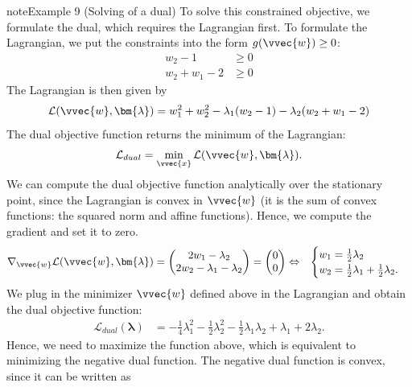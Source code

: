 \documentclass[letterpaper,10pt,english]{jupyterBook}
\begin{document}
\begin{sphinxadmonition}{note}{Example 9 (Solving of a dual)}
\sphinxAtStartPar
To solve this constrained objective, we formulate the dual, which requires the Lagrangian first. To formulate the Lagrangian, we put the constraints into the form \(g(\vvec{w})\geq 0\):
\begin{align*}
w_2-1&\geq 0\\
w_2+w_1-2 &\geq 0
\end{align*}
\sphinxAtStartPar
The Lagrangian is then given by
\begin{equation*}
\begin{split}\mathcal{L}(\vvec{w},\bm{\lambda})=w_1^2 +w_2^2 -\lambda_1(w_2-1)-\lambda_2(w_2+w_1-2)\end{split}
\end{equation*}
The dual objective function returns the minimum of the Lagrangian:
\begin{equation*}
\begin{split}\mathcal{L}_{dual}=\min_{\vvec{x}}\mathcal{L}(\vvec{w},\bm{\lambda}).\end{split}
\end{equation*}
We can compute the dual objective function analytically over the stationary point, since the Lagrangian is convex in \(\vvec{w}\) (it is the sum of convex functions: the squared norm and affine functions). Hence, we compute the gradient and set it to zero.
\begin{align*}
\nabla_\vvec{w}\mathcal{L}(\vvec{w},\bm{\lambda}) &= \begin{pmatrix}
2w_1-\lambda_2\\
2w_2-\lambda_1-\lambda_2
\end{pmatrix}
=\begin{pmatrix}
0\\ 0
\end{pmatrix}
\Leftrightarrow & \begin{cases}
w_1 = \frac12 \lambda_2\\
w_2 = \frac12 \lambda_1 + \frac12 \lambda_2.
\end{cases}
\end{align*}
\sphinxAtStartPar
We plug in the minimizer \(\vvec{w}\) defined above in the Lagrangian and obtain the dual objective function:
\begin{align*}
\mathcal{L}_{dual}(\bm{\lambda}) &= -\frac14 \lambda_1^2-\frac12 \lambda_2^2 -\frac12\lambda_1\lambda_2 + \lambda_1 +2\lambda_2.
\end{align*}
\sphinxAtStartPar
Hence, we need to maximize the function above, which is equivalent to minimizing the negative dual function. The negative dual function is convex, since it can be written as

\end{sphinxadmonition}
\end{document}
